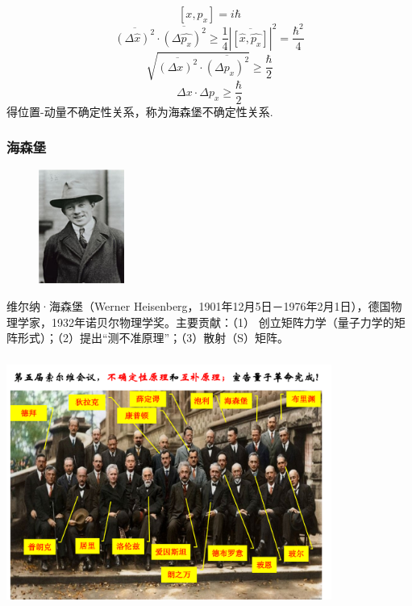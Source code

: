 \begin{frame}

$$ [x,p_x]=i\hbar $$
$$
\overline{(\Delta \hat{x})^{2}} \cdot \overline{(\Delta \hat{p_x})^{2}} 
\geq \frac{1}{4}|\overline{[\hat{x}, \hat{p_x}]}|^{2}=\frac{\hbar^2}{4}
$$
$$
\sqrt{\overline{(\Delta x)^{2}} \cdot \overline{(\Delta p_x)^{2}}} 
\geq \frac{\hbar}{2}
$$
$$  
\Delta x \cdot \Delta p_x 
\geq \frac{\hbar}{2}
$$ 
得位置-动量不确定性关系，称为海森堡不确定性关系.
\end{frame}

\begin{frame}
    \frametitle{海森堡}
    \begin{figure} %
        \includegraphics[width=0.25\textwidth]{figs/hesb.png}   
    \end{figure}
    维尔纳·海森堡（Werner Heisenberg，1901年12月5日－1976年2月1日），德国物理学家，1932年诺贝尔物理学奖。主要贡献：（1） 创立矩阵力学（量子力学的矩阵形式）；（2）提出“测不准原理”；（3）散射（S）矩阵。  
\end{frame}

\begin{frame}
    \frametitle{}
    \begin{center}
    \includegraphics[width=0.8\textwidth]{figs/uncert.png}
    \end{center}
\end{frame}


